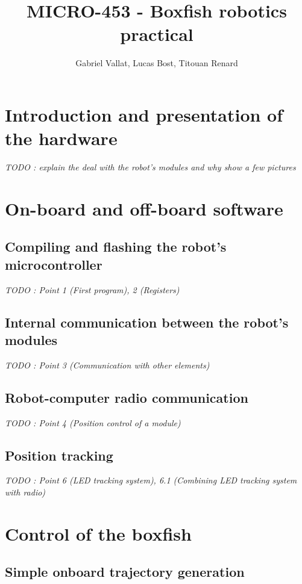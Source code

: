 \documentclass[11pt]{article}
\title{MICRO-453 - Boxfish robotics practical}
\author{Gabriel Vallat, Lucas Bost, Titouan Renard}
\begin{document}
\maketitle
\tableofcontents
\section{Introduction and presentation of the hardware}

\textit{TODO : explain the deal with the robot's modules and why show a few pictures}

\section{On-board and off-board software}


\subsection{Compiling and flashing the robot's microcontroller}

\textit{TODO : Point 1 (First program), 2 (Registers)}

\subsection{Internal communication between the robot's modules}

\textit{TODO : Point 3 (Communication with other elements)}

\subsection{Robot-computer radio communication}

\textit{TODO : Point 4 (Position control of a module)}

\subsection{Position tracking}

\textit{TODO : Point 6 (LED tracking system), 6.1 (Combining LED tracking system with radio)}

\section{Control of the boxfish}

\subsection{Simple onboard trajectory generation}
\end{document}
